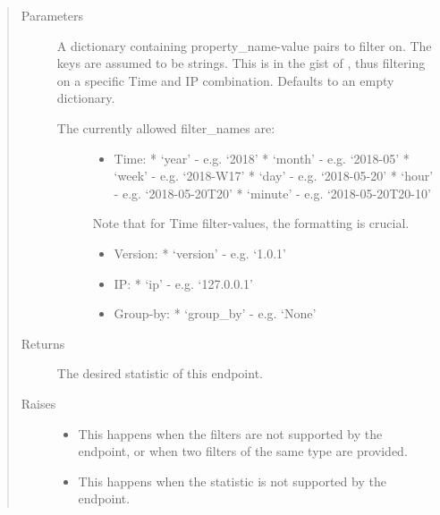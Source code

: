 \documentclass[letterpaper,10pt,english]{sphinxmanual}
\begin{document}
\begin{fulllineitems}
\begin{fulllineitems}
\begin{itemize}
\end{itemize}
\begin{quote}\begin{description}
\item[{Parameters}] \leavevmode
{} \textendash{} 
A dictionary containing property\_name-value pairs to filter on. The keys are assumed to be strings.
This is in the gist of , thus filtering on a specific Time and IP combination.
Defaults to an empty dictionary.
\begin{description}
\item[{The currently allowed filter\_names are:}] \leavevmode\begin{itemize}
\item {} 
Time:
* ‘year’   - e.g. ‘2018’
* ‘month’  - e.g. ‘2018-05’
* ‘week’   - e.g. ‘2018-W17’
* ‘day’    - e.g. ‘2018-05-20’
* ‘hour’   - e.g. ‘2018-05-20T20’
* ‘minute’ - e.g. ‘2018-05-20T20-10’

\end{itemize}

Note that for Time filter-values, the formatting is crucial.
\begin{itemize}
\item {} 
Version:
* ‘version’ - e.g. ‘1.0.1’

\item {} 
IP:
* ‘ip’ - e.g. ‘127.0.0.1’

\item {} 
Group-by:
* ‘group\_by’ - e.g. ‘None’

\end{itemize}

\end{description}


\item[{Returns}] \leavevmode
The desired statistic of this endpoint.

\item[{Raises}] \leavevmode\begin{itemize}
\item {} 
 \textendash{} This happens when the filters are not supported by the endpoint, or when two filters of
the same type are provided.

\item {} 
 \textendash{} This happens when the statistic is not supported by the endpoint.


\end{itemize}
\end{description}
\end{quote}
\end{fulllineitems}
\end{fulllineitems}
\end{document}

